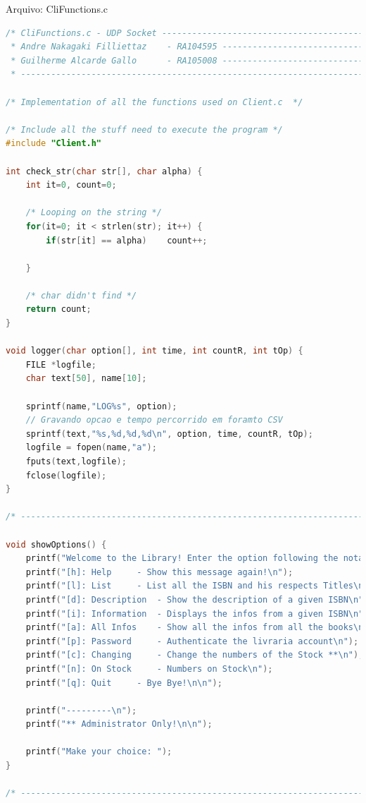 \documentclass[10pt,a4paper]{report}
\begin{document}
\begin{center}
Arquivo: CliFunctions.c
\end{center}
\begin{lstlisting}[language=C]
/* CliFunctions.c - UDP Socket ------------------------------------------------
 * Andre Nakagaki Filliettaz 	- RA104595 --------------------------------------
 * Guilherme Alcarde Gallo 		- RA105008 --------------------------------------
 * -------------------------------------------------------------------------- */

/* Implementation of all the functions used on Client.c  */

/* Include all the stuff need to execute the program */
#include "Client.h"

int check_str(char str[], char alpha) {
	int it=0, count=0;

	/* Looping on the string */
	for(it=0; it < strlen(str); it++) {
		if(str[it] == alpha)	count++;

	}

	/* char didn't find */
	return count;
}

void logger(char option[], int time, int countR, int tOp) {
	FILE *logfile;
	char text[50], name[10];
	
	sprintf(name,"LOG%s", option);
	// Gravando opcao e tempo percorrido em foramto CSV
	sprintf(text,"%s,%d,%d,%d\n", option, time, countR, tOp);
	logfile = fopen(name,"a");
	fputs(text,logfile);
	fclose(logfile);
}

/* -------------------------------------------------------------------------- */

void showOptions() {
	printf("Welcome to the Library! Enter the option following the notation:\n");
	printf("[h]: Help 	  - Show this message again!\n");
	printf("[l]: List  	  - List all the ISBN and his respects Titles\n");
	printf("[d]: Description  - Show the description of a given ISBN\n");
	printf("[i]: Information  - Displays the infos from a given ISBN\n");
	printf("[a]: All Infos	  - Show all the infos from all the books\n");
	printf("[p]: Password	  - Authenticate the livraria account\n");
	printf("[c]: Changing	  - Change the numbers of the Stock **\n");
	printf("[n]: On Stock	  - Numbers on Stock\n");
	printf("[q]: Quit	  - Bye Bye!\n\n");

	printf("---------\n");
	printf("** Administrator Only!\n\n");

	printf("Make your choice: ");
}

/* -------------------------------------------------------------------------- */


\end{lstlisting}
\end{document}
